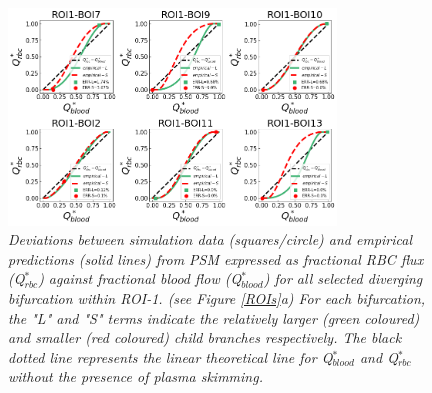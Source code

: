 \begin{figure}[H]
\centering
\includegraphics[width=0.775\textwidth]{images/DisproportionalityIndexQblood-ROI1.png}
\caption{\textit{Deviations between simulation data (squares/circle) and empirical predictions (solid lines) from PSM expressed as fractional RBC flux (Q$^{*}_{rbc}$) against fractional blood flow (Q$^{*}_{blood}$) for all selected diverging bifurcation within ROI-1. (see Figure \ref{ROIs}a) For each bifurcation, the "L" and "S" terms indicate the relatively larger (green coloured) and smaller (red coloured) child branches respectively. The black dotted line represents the linear theoretical line for Q$^{*}_{blood}$ and Q$^{*}_{rbc}$ without the presence of plasma skimming.} \label{DisproportionalityIndexQblood-ROI1}}
\end{figure}


